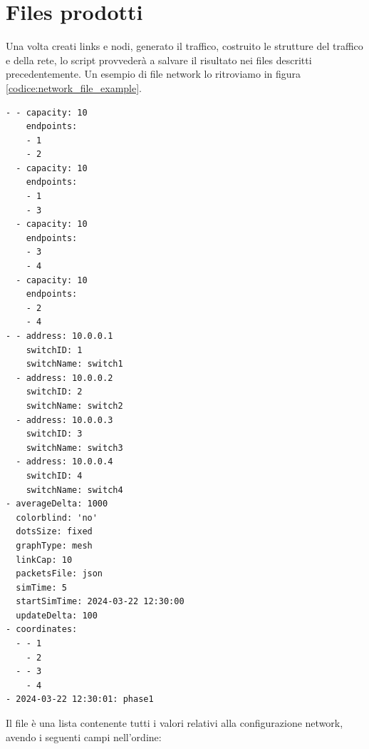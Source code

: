 \documentclass[binding=0.6cm]{sapthesis}
\begin{document}
\section{Files prodotti}
\label{sec:files_prodotti}
Una volta creati links e nodi, generato il traffico, costruito le strutture del traffico e della rete, lo script provvederà a salvare il risultato nei files descritti precedentemente.
Un esempio di file network lo ritroviamo in figura \ref*{codice:network_file_example}.
{\scriptsize %
\begin{lstlisting}[caption={Esempio di network file}, label={codice:network_file_example}]
- - capacity: 10
    endpoints:
    - 1
    - 2
  - capacity: 10
    endpoints:
    - 1
    - 3
  - capacity: 10
    endpoints:
    - 3
    - 4
  - capacity: 10
    endpoints:
    - 2
    - 4
- - address: 10.0.0.1
    switchID: 1
    switchName: switch1
  - address: 10.0.0.2
    switchID: 2
    switchName: switch2
  - address: 10.0.0.3
    switchID: 3
    switchName: switch3
  - address: 10.0.0.4
    switchID: 4
    switchName: switch4
- averageDelta: 1000
  colorblind: 'no'
  dotsSize: fixed
  graphType: mesh
  linkCap: 10
  packetsFile: json
  simTime: 5
  startSimTime: 2024-03-22 12:30:00
  updateDelta: 100
- coordinates:
  - - 1
    - 2
  - - 3
    - 4
- 2024-03-22 12:30:01: phase1

\end{lstlisting}
}
Il file è una lista contenente tutti i valori relativi alla configurazione network, avendo i seguenti campi nell'ordine:
\end{document}
